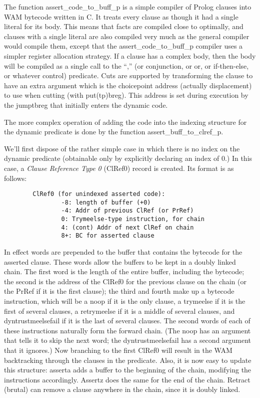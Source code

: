 \documentclass[11pt]{article}
\begin{document}
The function assert\_code\_to\_buff\_p is a simple compiler of Prolog
clauses into WAM bytecode written in C.  It treats every clause as
though it had a single literal for its body.  This means that facts
are compiled close to optimally, and clauses with a single literal are
also compiled very much as the general compiler would compile them,
except that the assert\_code\_to\_buff\_p compiler uses a simpler
register allocation strategy.  If a clause has a complex body, then
the body will be compiled as a single call to the ``,'' (or
conjunction, or or, or if-then-else, or whatever control) predicate.
Cuts are supported by transforming the clause to have an extra
argument which is the choicepoint address (actually displacement) to
use when cutting (with put(tp)breg).  This address is set during
execution by the jumptbreg that initially enters the dynamic code.

The more complex operation of adding the code into the indexing
structure for the dynamic predicate is done by the function
assert\_buff\_to\_clref\_p.

We'll first dispose of the rather simple case in which there is no
index on the dynamic predicate (obtainable only by explicitly
declaring an index of 0.)  In this case, a {\em Clause Reference Type
0} (ClRef0) record is created.  Its format is as follows:
\begin{verbatim}
        ClRef0 (for unindexed asserted code):
                -8: length of buffer (+0)
                -4: Addr of previous ClRef (or PrRef)
                0: Trymeelse-type instruction, for chain
                4: (cont) Addr of next ClRef on chain
                8+: BC for asserted clause
\end{verbatim}
In effect words are prepended to the buffer that contains the bytecode
for the asserted clause.  These words allow the buffers to be kept in
a doubly linked chain.  The first word is the length of the entire
buffer, including the bytecode; the second is the address of the
ClRef0 for the previous clause on the chain (or the PrRef if it is the
first clause); the third and fourth make up a bytecode instruction,
which will be a noop if it is the only clause, a trymeelse if it is
the first of several clauses, a retrymeelse if it is a middle of
several clauses, and dyntrustmeelsefail if it is the last of several
clauses.  The second words of each of these instructions naturally
form the forward chain.  (The noop has an argument that tells it to
skip the next word; the dyntrustmeelsefail has a second argument that
it ignores.)  Now branching to the first ClRef0 will result in the WAM
backtracking through the clauses in the predicate.  Also, it is now
easy to update this structure: asserta adds a buffer to the beginning
of the chain, modifying the instructions accordingly.  Assertz does
the same for the end of the chain.  Retract (brutal) can remove a
clause anywhere in the chain, since it is doubly linked.
\end{document}
